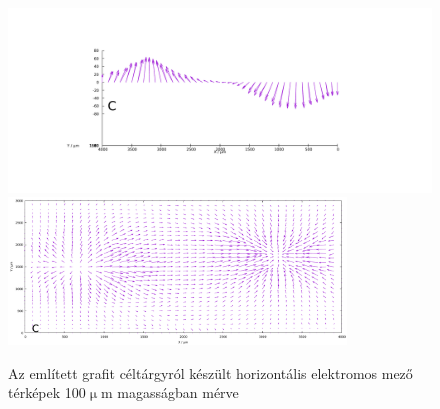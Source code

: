 \begin{figure}
\centering
\includegraphics[width=1\textwidth]{img/mérések/grafit_h100.pdf}
\includegraphics[width=0.8\textwidth]{img/mérések/grafit1_h100.pdf}

\caption{Az említett grafit céltárgyról készült horizontális elektromos mező térképek 100$\upmu$m magasságban mérve}
\label{fig:field_gh}
\end{figure}

